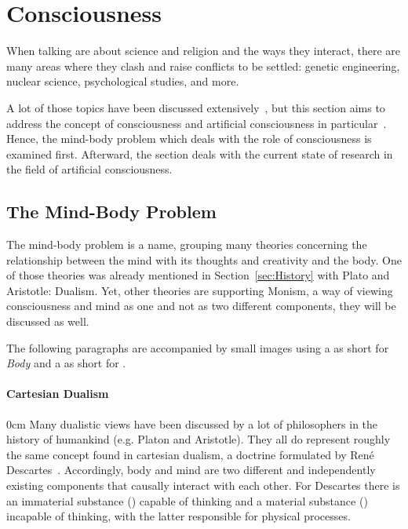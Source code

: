 \section{Consciousness}
\label{sec:Consciousness}

When talking are about science and religion and the ways they interact, there are many areas where they clash and raise conflicts to be settled: genetic engineering, nuclear science, psychological studies, and more.

A lot of those topics have been discussed extensively~\cite{barbour1993ethics,pfleiderer2010genethics,chernus1991nuclear}, but this section aims to address the concept of consciousness and artificial consciousness in particular~\cite{buttazzo2001artificial,chella2013artificial}.
Hence, the mind-body problem which deals with the role of consciousness is examined first.
Afterward, the section deals with the current state of research in the field of artificial consciousness.

\def\lmibop#1{\texttt{[image: figures/asq\_mibop\_\#1-compressed.pdf]}}

\newcommand*\moppreview[2]{\needspace{4\baselineskip}\paragraph[#2]{\smash{\raisebox{-2.3\baselineskip}{\lmibop{#1}}} #2}%
\parshape=4
0cm \linewidth
1.65cm \dimexpr\linewidth-1.65cm\relax
1.5cm \dimexpr\linewidth-1.5cm\relax
0cm \linewidth}

\subsection{The Mind-Body Problem}
\label{subsec:mind-body}The mind-body problem is a name, grouping many theories concerning the relationship between the mind with its thoughts and creativity and the body.
One of those theories was already mentioned in Section~\ref{sec:History} with Plato and Aristotle: Dualism.
Yet, other theories are supporting Monism, a way of viewing consciousness and mind as one and not as two different components, they will be discussed as well.

The following paragraphs are accompanied by small images using a  as short for \emph{Body} and a  as short for .


\moppreview{dualism}{Cartesian Dualism}
Many dualistic views have been discussed by a lot of philosophers in the history of humankind (e.g. Platon and Aristotle).
They all do represent roughly the same concept found in cartesian dualism, a doctrine formulated by René Descartes~\cite{Leach2017}.
Accordingly, body and mind are two different and independently existing components that causally interact with each other.
For Descartes there is an immaterial substance () capable of thinking and a material substance () incapable of thinking, with the latter responsible for physical processes.


